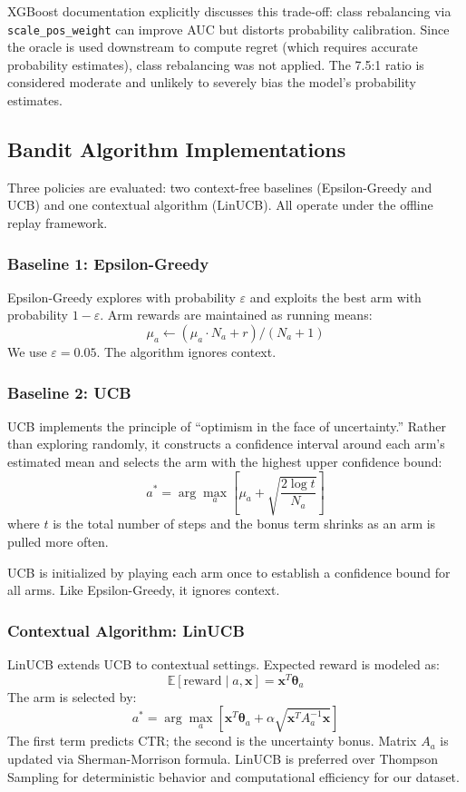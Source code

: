 \documentclass[12pt]{article}
\begin{document}
XGBoost documentation explicitly discusses this trade-off: class rebalancing via \texttt{scale\_pos\_weight} can improve AUC but distorts probability calibration. Since the oracle is used downstream to compute regret (which requires accurate probability estimates), class rebalancing was not applied. The 7.5:1 ratio is considered moderate and unlikely to severely bias the model's probability estimates.

\subsection{Bandit Algorithm Implementations}

Three policies are evaluated: two context-free baselines (Epsilon-Greedy and UCB) and one contextual algorithm (LinUCB). All operate under the offline replay framework.

\subsubsection{Baseline 1: Epsilon-Greedy}

Epsilon-Greedy explores with probability $\varepsilon$ and exploits the best arm with probability $1 - \varepsilon$. Arm rewards are maintained as running means:
\[
\mu_a \leftarrow (\mu_a \cdot N_a + r) / (N_a + 1)
\]
We use $\varepsilon = 0.05$. The algorithm ignores context.

\subsubsection{Baseline 2: UCB}

UCB implements the principle of ``optimism in the face of uncertainty.'' Rather than exploring randomly, it constructs a confidence interval around each arm's estimated mean and selects the arm with the highest upper confidence bound:
\[
a^* = \arg\max_a \left[ \mu_a + \sqrt{\frac{2 \log t}{N_a}} \right]
\]
where $t$ is the total number of steps and the bonus term shrinks as an arm is pulled more often.

UCB is initialized by playing each arm once to establish a confidence bound for all arms. Like Epsilon-Greedy, it ignores context.

\subsubsection{Contextual Algorithm: LinUCB}

LinUCB extends UCB to contextual settings. Expected reward is modeled as:
\[
\mathbb{E}[\text{reward} \mid a, \mathbf{x}] = \mathbf{x}^T \boldsymbol{\theta}_a
\]
The arm is selected by:
\[
a^* = \arg\max_a \left[ \mathbf{x}^T \boldsymbol{\theta}_a + \alpha \sqrt{\mathbf{x}^T A_a^{-1} \mathbf{x}} \right]
\]
The first term predicts CTR; the second is the uncertainty bonus. Matrix $A_a$ is updated via Sherman-Morrison formula. LinUCB is preferred over Thompson Sampling for deterministic behavior and computational efficiency for our dataset.
\end{document}
